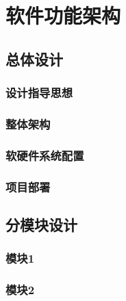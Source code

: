 \newpage
\section{软件功能架构}
\subsection{总体设计}
\subsubsection{设计指导思想}
\subsubsection{整体架构}
\subsubsection{软硬件系统配置}
\subsubsection{项目部署}
\subsection{分模块设计}
\subsubsection{模块1}
\subsubsection{模块2}
